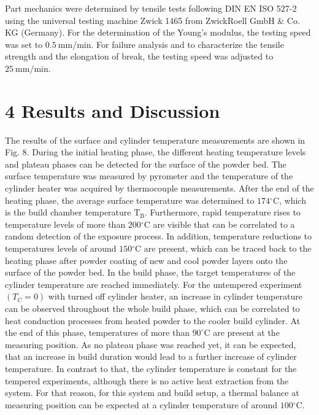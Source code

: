 \documentclass[10pt]{article}
\begin{document}
Part mechanics were determined by tensile tests following DIN EN ISO 527-2 using the universal testing machine Zwick 1465 from ZwickRoell GmbH \& Co. KG (Germany). For the determination of the Young's modulus, the testing speed was set to $0.5 \mathrm{~mm} / \mathrm{min}$. For failure analysis and to characterize the tensile strength and the elongation of break, the testing speed was adjusted to $25 \mathrm{~mm} / \mathrm{min}$.

\section*{4 Results and Discussion}
The results of the surface and cylinder temperature measurements are shown in Fig. 8. During the initial heating phase, the different heating temperature levels and plateau phases can be detected for the surface of the powder bed. The surface temperature was measured by pyrometer and the temperature of the cylinder heater was acquired by thermocouple measurements. After the end of the heating phase, the average surface temperature was determined to $174{ }^{\circ} \mathrm{C}$, which is the build chamber temperature $\mathrm{T}_{\mathrm{B}}$. Furthermore, rapid temperature rises to temperature levels of more than $200{ }^{\circ} \mathrm{C}$ are visible that can be correlated to a random detection of the exposure process. In addition, temperature reductions to temperatures levels of around $150{ }^{\circ} \mathrm{C}$ are present, which can be traced back to the heating phase after powder coating of new and cool powder layers onto the surface of the powder bed. In the build phase, the target temperatures of the cylinder temperature are reached immediately. For the untempered experiment\\
$\left(T_{C}=0\right)$ with turned off cylinder heater, an increase in cylinder temperature can be observed throughout the whole build phase, which can be correlated to heat conduction processes from heated powder to the cooler build cylinder. At the end of this phase, temperatures of more than $90^{\circ} \mathrm{C}$ are present at the measuring position. As no plateau phase was reached yet, it can be expected, that an increase in build duration would lead to a further increase of cylinder temperature. In contrast to that, the cylinder temperature is constant for the tempered experiments, although there is no active heat extraction from the system. For that reason, for this system and build setup, a thermal balance at measuring position can be expected at a cylinder temperature of around $100{ }^{\circ} \mathrm{C}$.
\end{document}
